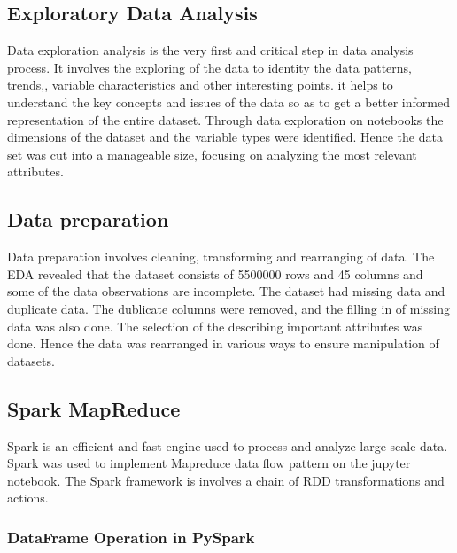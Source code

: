 \documentclass[12pt,letterpaper, twoside]{article}
\begin{document}
\subsection{ Exploratory Data Analysis}
Data exploration analysis is the very first and critical step in data analysis process. It involves the exploring of the data to identity the data patterns, trends,, variable characteristics and other interesting points. it helps to understand the key concepts and issues of the data so as to get a better informed representation of the entire dataset. Through data exploration on notebooks the dimensions of the dataset and the variable types were identified. Hence the data set was cut into a manageable size, focusing on analyzing the most relevant attributes.  

\subsection{Data preparation}
Data preparation involves cleaning, transforming and rearranging of data. The EDA revealed that the dataset consists of 5500000 rows and 45 columns and some of the data observations are incomplete. The dataset had missing data and duplicate data. The dublicate columns were removed, and the filling in of missing data was also done. The selection of the describing important  attributes was done. Hence the data was rearranged in various ways to ensure  manipulation of datasets. 


\subsection{Spark MapReduce}
Spark is an efficient and fast engine used to process and analyze large-scale data. Spark was used to implement Mapreduce data flow pattern on the jupyter notebook. The Spark framework is involves a chain of RDD transformations and actions. 
\subsubsection{DataFrame Operation in PySpark}
\end{document}
